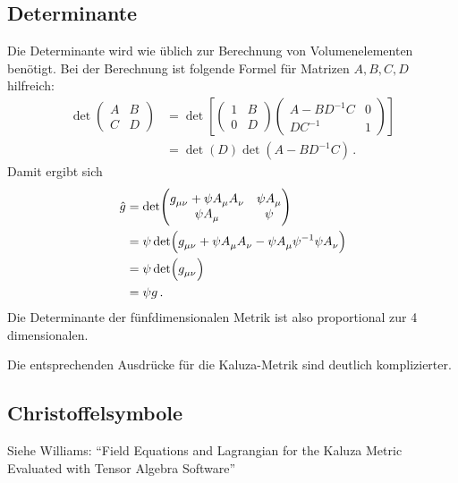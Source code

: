\subsection{Determinante}
Die Determinante wird wie üblich zur Berechnung von Volumenelementen benötigt.
Bei der Berechnung ist folgende Formel für Matrizen $A,B,C,D$ hilfreich:
\begin{equation}
\begin{split}
\det\begin{pmatrix}A& B\\ C& D\end{pmatrix}&=\det\left[
\begin{pmatrix}1& B\\0& D\end{pmatrix}\begin{pmatrix}A-BD^{-1}C& 0\\DC^{-1
}& 1\end{pmatrix} \right]\\
&= \det(D) \det\left(A - B D^{-1}
C\right)\,.
\end{split}
\end{equation}
Damit ergibt sich 
\begin{equation}
\begin{split}
 \hat{g}&=
 \det\begin{pmatrix}\tensor{g}{_\mu_\nu}+\psi\tensor{A}{_\mu}\tensor{A}{_\nu}
 &\psi \tensor{A}{_\mu}\\
 \psi \tensor{A}{_\mu}	 & \psi
 \end{pmatrix}\\
 &=\psi
 \det\left(\tensor{g}{_\mu_\nu}+\psi\tensor{A}{_\mu}\tensor{A}{_\nu}
 -\psi\tensor{A}{_\mu}\psi^{-1}\psi\tensor{A}{_\nu}\right)\\
 &=\psi \det\left(\tensor{g}{_\mu_\nu}\right)\\
 &=\psi g\,.
\end{split}
\end{equation}
Die Determinante der fünfdimensionalen Metrik ist also proportional zur 4
dimensionalen. 
\begin{bemerkung}
Die entsprechenden Ausdrücke für die Kaluza-Metrik sind deutlich komplizierter.
\end{bemerkung}
\subsection{Christoffelsymbole}
Siehe Williams: "`Field Equations and Lagrangian for the Kaluza Metric
Evaluated with Tensor Algebra Software"'\cite{williams2015field}
